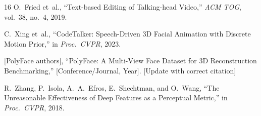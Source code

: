 \documentclass[conference]{IEEEtran}
\begin{document}
\begin{thebibliography}{16}
O.~Fried et~al.,
``Text-based Editing of Talking-head Video,''
\emph{ACM TOG}, vol.~38, no.~4, 2019.

C.~Xing et~al.,
``CodeTalker: Speech-Driven 3D Facial Animation with Discrete Motion Prior,''
in \emph{Proc.\ CVPR}, 2023.

[PolyFace authors],
``PolyFace: A Multi-View Face Dataset for 3D Reconstruction Benchmarking,''
[Conference/Journal, Year].
[Update with correct citation]

R.~Zhang, P.~Isola, A.~A.~Efros, E.~Shechtman, and O.~Wang,
``The Unreasonable Effectiveness of Deep Features as a Perceptual Metric,''
in \emph{Proc.\ CVPR}, 2018.

\end{thebibliography}
\end{document}
